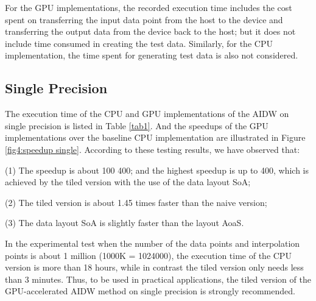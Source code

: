\documentclass[fleqn,11pt]{wlscirep}
\begin{document}
For the GPU implementations, the recorded execution time includes the cost 
spent on transferring the input data point from the host to the device and 
transferring the output data from the device back to the host; but it does 
not include time consumed in creating the test data. Similarly, for the CPU 
implementation, the time spent for generating test data is also not 
considered.

\subsection{Single Precision}
The execution time of the CPU and GPU implementations of the AIDW on single 
precision is listed in Table \ref{tab1}. And the speedups of the GPU implementations 
over the baseline CPU implementation are illustrated in Figure \ref{fig4:speedup single}. According 
to these testing results, we have observed that:

(1) The speedup is about 100  400; and the highest speedup is up to 
400, which is achieved by the tiled version with the use of the data layout 
SoA;

(2) The tiled version is about 1.45 times faster than the naive version;

(3) The data layout SoA is slightly faster than the layout AoaS.

In the experimental test when the number of the data points and 
interpolation points is about 1 million (1000K = 1024000), the execution 
time of the CPU version is more than 18 hours, while in contrast the tiled 
version only needs less than 3 minutes. Thus, to be used in practical 
applications, the tiled version of the GPU-accelerated AIDW method on single 
precision is strongly recommended.
\end{document}
